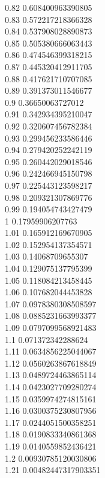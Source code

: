 {0.82	0.608400963390805\\
0.83	0.572217218366328\\
0.84	0.537908028890873\\
0.85	0.505380666063443\\
0.86	0.474546399318215\\
0.87	0.445320412911705\\
0.88	0.417621710707085\\
0.89	0.391373011546677\\
0.9	0.36650063727012\\
0.91	0.342934395210047\\
0.92	0.320607456782384\\
0.93	0.299456233586446\\
0.94	0.279420252242119\\
0.95	0.260442029018546\\
0.96	0.242466945150798\\
0.97	0.225443123598217\\
0.98	0.209321307869776\\
0.99	0.194054743427479\\
1	0.17959906207763\\
1.01	0.165912169670905\\
1.02	0.152954137354571\\
1.03	0.14068709655307\\
1.04	0.129075137795399\\
1.05	0.118084213458445\\
1.06	0.107682044453828\\
1.07	0.0978380308508597\\
1.08	0.0885231663993377\\
1.09	0.0797099568921483\\
1.1	0.071372342288624\\
1.11	0.0634856225044067\\
1.12	0.0560263867618849\\
1.13	0.0489724463865114\\
1.14	0.0423027709280274\\
1.15	0.0359974274815161\\
1.16	0.0300375230807956\\
1.17	0.0244051500358251\\
1.18	0.0190833340861368\\
1.19	0.0140559852436421\\
1.2	0.00930785120030806\\
1.21	0.00482447317903351\\
}
